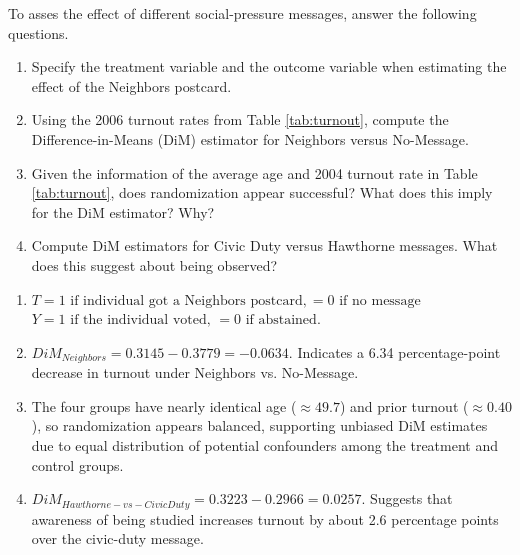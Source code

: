 \documentclass[11pt]{exam}
\begin{document}
\begin{questions}
\question[2] To asses the effect of different social-pressure messages, answer the following questions.
\begin{enumerate}[label=(\alph*)]
    \item Specify the treatment variable and the outcome variable when estimating the effect of the Neighbors postcard.
    \item Using the 2006 turnout rates from Table \ref{tab:turnout}, compute the Difference-in-Means (DiM) estimator for Neighbors versus No-Message.
    \item Given the information of the average age and 2004 turnout rate in Table \ref{tab:turnout}, does randomization appear successful? What does this imply for the DiM estimator? Why?
    \item Compute DiM estimators for Civic Duty versus Hawthorne messages. What does this suggest about being observed?
\end{enumerate}

\begin{solution}
\begin{enumerate}[label=(\alph*)]
    \item 
    $T = 1 \text{ if individual got a Neighbors postcard}, = 0 \text{ if no message}$ \\
    $Y = 1 \text{ if the individual voted, } = 0 \text{ if abstained}$.
    \item 
    $DiM_{Neighbors} = 0.3145 - 0.3779 = -0.0634.$ Indicates a 6.34 percentage-point decrease in turnout under Neighbors vs. No-Message.
    \item The four groups have nearly identical age ($\approx 49.7$) and prior turnout ($\approx 0.40$), so randomization appears balanced, supporting unbiased DiM estimates due to equal distribution of potential confounders among the treatment and control groups.
    \item 
    $DiM_{Hawthorne-vs-CivicDuty} = 0.3223 - 0.2966 = 0.0257.$ Suggests that awareness of being studied increases turnout by about 2.6 percentage points over the civic-duty message.
\end{enumerate}
\end{solution}


\end{questions}
\end{document}
